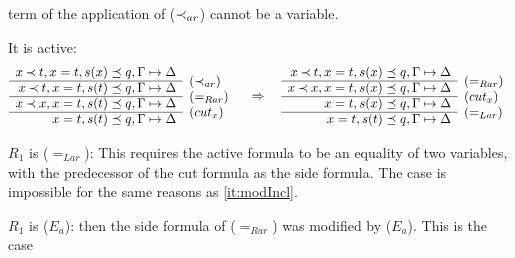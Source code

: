 \begin{PROOF}
\begin{LS}
\begin{LSA}
\begin{LSB}
term of the application of ($\mathbin{\prec}_{ar}$) cannot be a variable.
 \item It is active:
\[ \begin{array}{rl}
 x\Incl t, x=t, s(x)\preceq q, \GSD \\ \cline{1-1}
 x\Incl t, x=t, s(t)\preceq q, \GSD & \rabove{(\Incl_{ar})} \\ \cline{1-1}
 x\Incl x, x=t, s(t)\preceq q, \GSD & \rabove{(=_{Rar})} \\ \cline{1-1}
           x=t, s(t)\preceq q, \GSD & \rabove{(cut_x)} \end{array} \conv
 \begin{array}{rl}
 x\Incl t, x=t, s(x)\preceq q, \GSD \\ \cline{1-1}
 x\Incl x, x=t, s(x)\preceq q, \GSD & \rabove{(=_{Rar})} \\ \cline{1-1}
          x=t, s(x)\preceq q, \GSD & \rabove{(cut_x)} \\ \cline{1-1}
           x=t, s(t)\preceq q, \GSD & \rabove{(=_{Lar})} \end{array} \]
\end{LSB}
\item $R_1$ is ($=_{Lar}$):
This requires the active formula to be an equality of two variables, with the
predecessor of the cut formula as the side formula. The
case is impossible for the same reasons as \ref{it:modIncl}.
%
\item $R_1$ is ($E_a$):
then the side formula of ($=_{Rar}$) was modified by ($E_a$). This is the case

\end{LSA}
\end{LS}
\end{PROOF}

